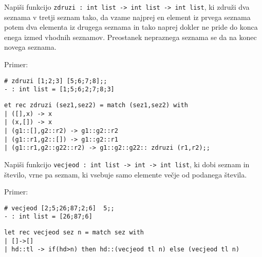\begin{ex}
Napi\v si funkcijo \lstinline{zdruzi : int list -> int list -> int list}, ki zdru\v zi dva seznama v tretji seznam tako, da vzame najprej en element iz prvega seznama potem dva elementa iz drugega seznama in tako naprej dokler ne pride do konca enega izmed vhodnih seznamov. Preostanek nepraznega seznama se da na konec novega seznama.

Primer: \begin{lstlisting}
# zdruzi [1;2;3] [5;6;7;8];;
- : int list = [1;5;6;2;7;8;3]
\end{lstlisting}

\begin{sol}
\begin{lstlisting}
et rec zdruzi (sez1,sez2) = match (sez1,sez2) with
| ([],x) -> x 
| (x,[]) -> x 
| (g1::[],g2::r2) -> g1::g2::r2 
| (g1::r1,g2::[]) -> g1::g2::r1 
| (g1::r1,g2::g22::r2) -> g1::g2::g22:: zdruzi (r1,r2);;
\end{lstlisting}
\end{sol}
\end{ex}



\begin{ex}
Napi\v si funkcijo \lstinline{vecjeod : int list -> int -> int list}, ki dobi seznam in \v stevilo, vrne pa seznam, ki vsebuje samo elemente ve\v cje od podanega \v stevila.

Primer: \begin{lstlisting}
# vecjeod [2;5;26;87;2;6]  5;;
- : int list = [26;87;6] 
\end{lstlisting}

\begin{sol}
\begin{lstlisting}
let rec vecjeod sez n = match sez with
| []->[]
| hd::tl -> if(hd>n) then hd::(vecjeod tl n) else (vecjeod tl n)
\end{lstlisting}
\end{sol}

\end{ex}



